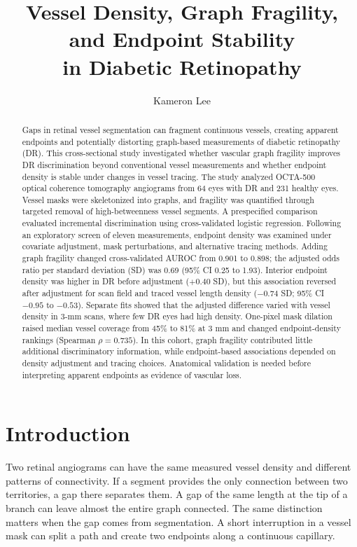 \documentclass[letterpaper]{article}
\title{Vessel Density, Graph Fragility, and Endpoint Stability\\in Diabetic Retinopathy}
\author{Kameron Lee}
\begin{document}
\maketitle

\begin{abstract}
Gaps in retinal vessel segmentation can fragment continuous vessels, creating apparent endpoints and potentially distorting graph-based measurements of diabetic retinopathy (DR). This cross-sectional study investigated whether vascular graph fragility improves DR discrimination beyond conventional vessel measurements and whether endpoint density is stable under changes in vessel tracing. The study analyzed OCTA-500 optical coherence tomography angiograms from 64 eyes with DR and 231 healthy eyes. Vessel masks were skeletonized into graphs, and fragility was quantified through targeted removal of high-betweenness vessel segments. A prespecified comparison evaluated incremental discrimination using cross-validated logistic regression. Following an exploratory screen of eleven measurements, endpoint density was examined under covariate adjustment, mask perturbations, and alternative tracing methods. Adding graph fragility changed cross-validated AUROC from 0.901 to 0.898; the adjusted odds ratio per standard deviation (SD) was 0.69 (95\% CI 0.25 to 1.93). Interior endpoint density was higher in DR before adjustment ($+0.40$ SD), but this association reversed after adjustment for scan field and traced vessel length density ($-0.74$ SD; 95\% CI $-0.95$ to $-0.53$). Separate fits showed that the adjusted difference varied with vessel density in 3-mm scans, where few DR eyes had high density. One-pixel mask dilation raised median vessel coverage from 45\% to 81\% at 3 mm and changed endpoint-density rankings (Spearman $\rho=0.735$). In this cohort, graph fragility contributed little additional discriminatory information, while endpoint-based associations depended on density adjustment and tracing choices. Anatomical validation is needed before interpreting apparent endpoints as evidence of vascular loss.
\end{abstract}

\section{Introduction}
Two retinal angiograms can have the same measured vessel density and different patterns of connectivity. If a segment provides the only connection between two territories, a gap there separates them. A gap of the same length at the tip of a branch can leave almost the entire graph connected. The same distinction matters when the gap comes from segmentation. A short interruption in a vessel mask can split a path and create two endpoints along a continuous capillary.
\end{document}
